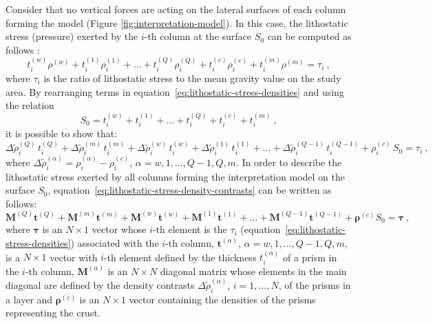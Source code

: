 \documentclass[manuscript]{geophysics}
\begin{document}
Consider that no vertical forces are acting on the lateral surfaces of 
each column forming the model (Figure \ref{fig:interpretation-model}). In this case, 
the lithostatic stress (pressure) exerted by the $i$-th column at the surface $S_{0}$
can be computed as follows \citep{turcotte-schubert2002}:
\begin{equation}
t^{(w)}_{i} \rho^{(w)} + t^{(1)}_{i} \rho^{(1)}_{i} + \dots + 
t^{(Q)}_{i} \rho^{(Q)}_{i} + t^{(c)}_{i} \rho^{(c)}_{i} + t^{(m)}_{i} \rho^{(m)} 
= \tau_{i} \: ,
\label{eq:lithostatic-stress-densities}
\end{equation}
where $\tau_{i}$ is the ratio of lithostatic stress to the mean gravity 
value on the study area.
By rearranging terms in equation~\ref{eq:lithostatic-stress-densities} 
and using the relation
\begin{equation}
S_{0} = t^{(w)}_{i} + t^{(1)}_{i} + \dots + t^{(Q)}_{i} + t^{(c)}_{i} + t^{(m)}_{i} \: ,
\label{eq:S0}
\end{equation}
it is possible to show that:
\begin{equation}
\Delta \tilde{\rho}^{(Q)}_{i} \, t^{(Q)}_{i} + 
\Delta \tilde{\rho}^{(m)}_{i} \, t^{(m)}_{i} + 
\Delta \tilde{\rho}^{(w)}_{i} \, t^{(w)}_{i} + 
\Delta \tilde{\rho}^{(1)}_{i} \, t^{(1)}_{i} +
\dots + 
\Delta \tilde{\rho}^{(Q-1)}_{i} \, t^{(Q-1)}_{i} +
\rho^{(c)}_{i} \, S_{0} = \tau_{i} \: ,
\label{eq:lithostatic-stress-density-contrasts}
\end{equation}
where $\Delta \tilde{\rho}^{(\alpha)}_{i} = \rho^{(\alpha)}_{i} - \rho^{(c)}_{i}$, 
$\alpha = w, 1, \dots, Q-1, Q, m$.
In order to describe the lithostatic stress exerted by all columns forming the
interpretation model on the surface $S_{0}$, 
equation~\ref{eq:lithostatic-stress-density-contrasts} 
can be written as follows:
\begin{equation}
\mathbf{M}^{(Q)} \mathbf{t}^{(Q)} + \mathbf{M}^{(m)} \mathbf{t}^{(m)} + \mathbf{M}^{(w)}
\mathbf{t}^{(w)} + \mathbf{M}^{(1)} \mathbf{t}^{(1)} + \dots + \mathbf{M}^{(Q-1)}
\mathbf{t}^{(Q-1)} + \boldsymbol{\rho}^{(c)} S_{0} = \boldsymbol{\tau} \: ,
\label{eq:lithostatic-stress-matrix}
\end{equation}
where $\boldsymbol{\tau}$ is an $N \times 1$ vector whose $i$-th element is
the $\tau_{i}$ (equation~\ref{eq:lithostatic-stress-densities}) associated with
the $i$-th column, $\mathbf{t}^{(\alpha)}$, $\alpha = w, 1, \dots, Q-1, Q, m$, 
is a $N \times 1$ vector with $i$-th element defined by the thickness 
$t^{(\alpha)}_{i}$ of a prism in the $i$-th column, $\mathbf{M}^{(\alpha)}$ is an $N \times N$ diagonal 
matrix whose elements in the main diagonal are defined by the density contrasts 
$\Delta \tilde{\rho}^{(\alpha)}_{i}$, $i = 1, \dots, N$, of the prisms in a layer and
$\boldsymbol{\rho}^{(c)}$ is an $N \times 1$ vector containing the densities of the prisms
representing the crust. 
\end{document}
